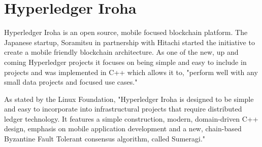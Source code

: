 \section{Hyperledger Iroha}

Hyperledger Iroha is an open source, mobile focused blockchain platform. The Japanese startup, 
Soramitsu in partnership with Hitachi started the initiative to create a mobile friendly 
blockchain architecture. As one of the new, up and coming Hyperledger projects it focuses on being
simple and easy to include in projects and was implemented in C++ which allows it to, "perform well 
with any small data projects and focused use cases."\cite{Brian Behlendorf}

As stated by the Linux Foundation, "Hyperledger Iroha is designed to be simple and easy to incorporate 
into infrastructural projects that require distributed ledger technology. It features a simple 
construction, modern, domain-driven C++ design, emphasis on mobile application development and a new, 
chain-based Byzantine Fault Tolerant consensus algorithm, called Sumeragi."\cite{Active Status Iroha}
